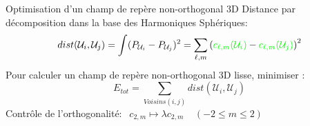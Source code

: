 \begin{frame}{Optimisation d'un champ de repère non-orthogonal 3D}
    \centering
    \footnotesize
    Distance par décomposition dans la base des Harmoniques Sphériques:
    $$ dist(\mathcal{U}_i, \mathcal{U}_j) = \int (P_{\mathcal{U}_i} - P_{\mathcal{U}_j})^2 = \sum_{\ell, m} \left({\color{green}c_{\ell,m}(\mathcal{U}_i)} - {\color{green}c_{\ell,m}(\mathcal{U}_j)} \right)^2$$
    Pour calculer un champ de repère non-orthogonal 3D lisse, minimiser :
    $$ E_{tot} = \sum_{Voisins(i, j)} dist(\mathcal{U}_i, \mathcal{U}_j)$$
    Contrôle de l'orthogonalité: $\ \ c_{2,m} \mapsto \lambda c_{2,m} \ \ \ \ \ (-2 \leq m \leq 2)$ %
    

\end{frame}
